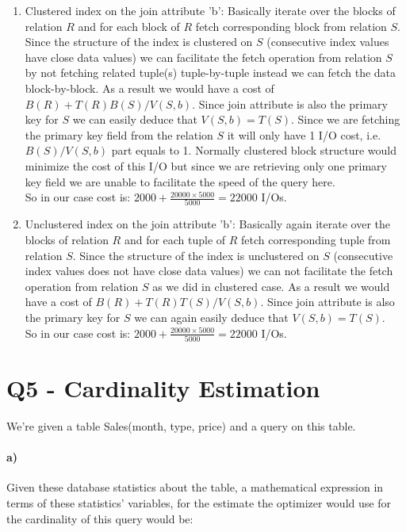 \documentclass[a4paper,12pt]{article}
\begin{document}
\begin{enumerate}[i]
    \item Clustered index on the join attribute 'b': Basically iterate over the blocks of relation $R$ and for each block of $R$ fetch corresponding block from relation $S$. Since the structure of the index is clustered on $S$ (consecutive index values have close data values) we can facilitate the fetch operation from relation $S$ by not fetching related tuple(s) tuple-by-tuple instead we can fetch the data block-by-block. As a result we would have a cost of $B(R) + T(R)B(S)/V(S,b)$. Since join attribute is also the primary key for $S$ we can easily deduce that $V(S,b) = T(S)$. Since we are fetching the primary key field from the relation $S$ it will only have 1 I/O cost, i.e. $B(S)/V(S,b)$ part equals to 1. Normally clustered block structure would minimize the cost of this I/O but since we are retrieving only one primary key field we are unable to facilitate the speed of the query here.  \\
    
    So in our case cost is: $2000 + \frac{20000\times 5000}{5000}=22000$ I/Os.
    \item Unclustered index on the join attribute 'b': Basically again iterate over the blocks of relation $R$ and for each tuple of $R$ fetch corresponding tuple from relation $S$. Since the structure of the index is unclustered on $S$ (consecutive index values does not have close data values) we can not facilitate the fetch operation from relation $S$ as we did in clustered case. As a result we would have a cost of $B(R) + T(R)T(S)/V(S,b)$. Since join attribute is also the primary key for $S$ we can again easily deduce that $V(S,b) = T(S)$. \\
    
    So in our case cost is: $2000 + \frac{20000\times 5000}{5000}=22000$ I/Os.
\end{enumerate}

\section{Q5 - Cardinality Estimation}

We're given a table Sales(month, type, price) and a query on this table.

\paragraph{a)} Given these database statistics about the table, a mathematical expression in terms of these statistics' variables, for the estimate the optimizer would use for the cardinality of this query would be:
\end{document}
